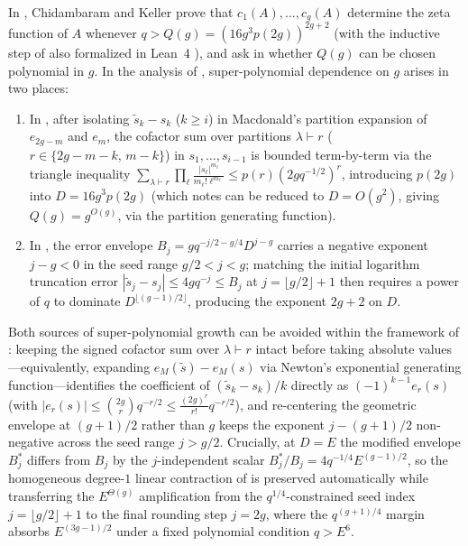 \documentclass[11pt]{amsart}
\theoremstyle{remark}
\begin{document}
In \cite[Theorem~1.1]{CK26}, Chidambaram and Keller prove that $c_1(A), \dots, c_g(A)$ determine the zeta function of $A$ whenever $q > Q(g) = (16 g^3 p(2g))^{2g+2}$ (with the inductive step of \cite[Lemma~5.2]{CK26} also formalized in Lean~4 \cite{CKcode}), and ask in \cite[Remark~7.12]{CK26} whether $Q(g)$ can be chosen polynomial in $g$. In the analysis of \cite[Sections~5--6]{CK26}, super-polynomial dependence on $g$ arises in two places:
\begin{enumerate}
\item In \cite[Lemma~5.2]{CK26}, after isolating $\tilde{s}_k - s_k$ ($k \ge i$) in Macdonald's partition expansion of $e_{2g-m}$ and $e_m$, the cofactor sum over partitions $\lambda \vdash r$ ($r \in \{2g - m - k,\, m - k\}$) in $s_1, \dots, s_{i-1}$ is bounded term-by-term via the triangle inequality $\sum_{\lambda \vdash r} \prod_\ell \frac{|s_\ell|^{m_\ell}}{m_\ell! \ell^{m_\ell}} \le p(r)(2g q^{-1/2})^r$, introducing $p(2g)$ into $D = 16 g^3 p(2g)$ (which \cite[Remark~7.12]{CK26} notes can be reduced to $D = O(g^2)$, giving $Q(g) = g^{O(g)}$, via the partition generating function).
\item In \cite[Lemma~5.3]{CK26}, the error envelope $B_j = g q^{-j/2 - g/4} D^{j - g}$ carries a negative exponent $j - g < 0$ in the seed range $g/2 < j < g$; matching the initial logarithm truncation error $|\tilde{s}_j - s_j| \le 4g q^{-j} \le B_j$ at $j = \lfloor g/2 \rfloor + 1$ then requires a power of $q$ to dominate $D^{\lfloor (g-1)/2 \rfloor}$, producing the exponent $2g + 2$ on $D$.
\end{enumerate}

Both sources of super-polynomial growth can be avoided within the framework of \cite[Sections~4--6]{CK26}: keeping the signed cofactor sum over $\lambda \vdash r$ intact before taking absolute values---equivalently, expanding $e_M(\tilde{s}) - e_M(s)$ via Newton's exponential generating function---identifies the coefficient of $(\tilde{s}_k - s_k)/k$ directly as $(-1)^{k-1} e_r(s)$ (with $|e_r(s)| \le \binom{2g}{r} q^{-r/2} \le \frac{(2g)^r}{r!} q^{-r/2}$), and re-centering the geometric envelope at $(g + 1)/2$ rather than $g$ keeps the exponent $j - (g + 1)/2$ non-negative across the seed range $j > g/2$. Crucially, at $D = E$ the modified envelope $B_j^*$ differs from $B_j$ by the $j$-independent scalar $B_j^* / B_j = 4 q^{-1/4} E^{(g-1)/2}$, so the homogeneous degree-$1$ linear contraction of \cite[Lemma~5.2]{CK26} is preserved automatically while transferring the $E^{\Theta(g)}$ amplification from the $q^{1/4}$-constrained seed index $j = \lfloor g/2 \rfloor + 1$ to the final rounding step $j = 2g$, where the $q^{(g+1)/4}$ margin absorbs $E^{(3g-1)/2}$ under a fixed polynomial condition $q > E^6$.
\end{document}
